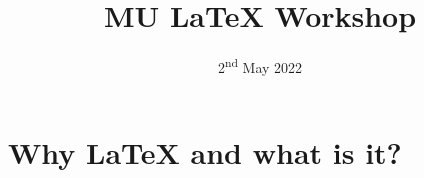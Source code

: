 \documentclass{beamer}
\title{MU \LaTeX{} Workshop}
\date{2\textsuperscript{nd} May 2022}
\begin{document}
\begin{frame}
    \titlepage
\end{frame}

\section{Why LaTeX and what is it?}

\begin{frame}
    \tableofcontents
\end{frame}
\end{document}
